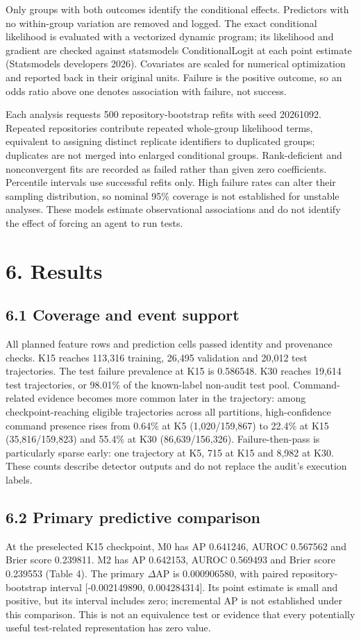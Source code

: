 \documentclass[10pt,a4paper]{article}
\begin{document}
Only groups with both outcomes identify the conditional effects. Predictors with no within-group variation are removed and logged. The exact conditional likelihood is evaluated with a vectorized dynamic program; its likelihood and gradient are checked against statsmodels ConditionalLogit at each point estimate (Statsmodels developers 2026). Covariates are scaled for numerical optimization and reported back in their original units. Failure is the positive outcome, so an odds ratio above one denotes association with failure, not success.

Each analysis requests 500 repository-bootstrap refits with seed 20261092. Repeated repositories contribute repeated whole-group likelihood terms, equivalent to assigning distinct replicate identifiers to duplicated groups; duplicates are not merged into enlarged conditional groups. Rank-deficient and nonconvergent fits are recorded as failed rather than given zero coefficients. Percentile intervals use successful refits only. High failure rates can alter their sampling distribution, so nominal 95\% coverage is not established for unstable analyses. These models estimate observational associations and do not identify the effect of forcing an agent to run tests.

\section{6. Results}
\subsection{6.1 Coverage and event support}
All planned feature rows and prediction cells passed identity and provenance checks. K15 reaches 113,316 training, 26,495 validation and 20,012 test trajectories. The test failure prevalence at K15 is 0.586548. K30 reaches 19,614 test trajectories, or 98.01\% of the known-label non-audit test pool. Command-related evidence becomes more common later in the trajectory: among checkpoint-reaching eligible trajectories across all partitions, high-confidence command presence rises from 0.64\% at K5 (1,020/159,867) to 22.4\% at K15 (35,816/159,823) and 55.4\% at K30 (86,639/156,326). Failure-then-pass is particularly sparse early: one trajectory at K5, 715 at K15 and 8,982 at K30. These counts describe detector outputs and do not replace the audit's execution labels.

\subsection{6.2 Primary predictive comparison}
At the preselected K15 checkpoint, M0 has AP 0.641246, AUROC 0.567562 and Brier score 0.239811. M2 has AP 0.642153, AUROC 0.569493 and Brier score 0.239553 (Table 4). The primary $\Delta$AP is 0.000906580, with paired repository-bootstrap interval [-0.002149890, 0.004284314]. Its point estimate is small and positive, but its interval includes zero; incremental AP is not established under this comparison. This is not an equivalence test or evidence that every potentially useful test-related representation has zero value.
\end{document}
